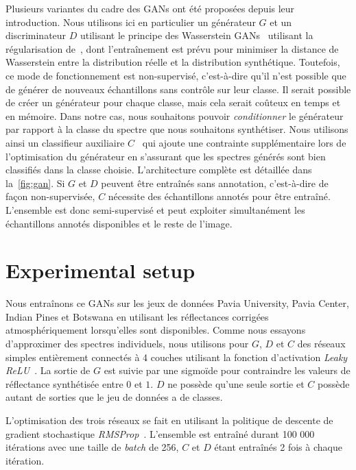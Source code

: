 Plusieurs variantes du cadre des \glspl{GAN} ont été proposées depuis leur introduction. Nous utilisons ici en particulier un générateur $G$ et un discriminateur $D$ utilisant le principe des Wasserstein \glspl{GAN}~\cite{arjovsky_wasserstein_2017} utilisant la régularisation de~\citet{gulrajani_improved_2017}, dont l'entraînement est prévu pour minimiser la distance de Wasserstein entre la distribution réelle et la distribution synthétique. Toutefois, ce mode de fonctionnement est non-supervisé, c'est-à-dire qu'il n'est possible que de générer de nouveaux échantillons sans contrôle sur leur classe. Il serait possible de créer un générateur pour chaque classe, mais cela serait coûteux en temps et en mémoire. Dans notre cas, nous souhaitons pouvoir \emph{conditionner} le générateur par rapport à la classe du spectre que nous souhaitons synthétiser. Nous utilisons ainsi un classifieur auxiliaire $C$~\cite{odena_conditional_2017} qui ajoute une contrainte supplémentaire lors de l'optimisation du générateur en s'assurant que les spectres générés sont bien classifiés dans la classe choisie.
L'architecture complète est détaillée dans la~\cref{fig:gan}. Si $G$ et $D$ peuvent être entraînés sans annotation, c'est-à-dire de façon non-supervisée, $C$ nécessite des échantillons annotés pour être entraîné. L'ensemble est donc semi-supervisé et peut exploiter simultanément les échantillons annotés disponibles et le reste de l'image.

\section{Experimental setup}
\label{sec:experimental_setup}

Nous entraînons ce \glspl{GAN} sur les jeux de données Pavia University, Pavia Center, Indian Pines et Botswana en utilisant les réflectances corrigées atmosphériquement lorsqu'elles sont disponibles. Comme nous essayons d'approximer des spectres individuels, nous utilisons pour $G$, $D$ et $C$ des réseaux simples entièrement connectés à 4 couches utilisant la fonction d'activation \emph{Leaky \gls{ReLU}}~\cite{maas_rectifier_2013}. La sortie de $G$ est suivie par une sigmoïde pour contraindre les valeurs de réflectance synthétisée entre $0$ et $1$. $D$ ne possède qu'une seule sortie et $C$ possède autant de sorties que le jeu de données a de classes.

L'optimisation des trois réseaux se fait en utilisant la politique de descente de gradient stochastique \emph{RMSProp}~\cite{rmsprop}. L'ensemble est entraîné durant 100 000 itérations avec une taille de \emph{batch} de 256, $C$ et $D$ étant entraînés 2 fois à chaque itération.


